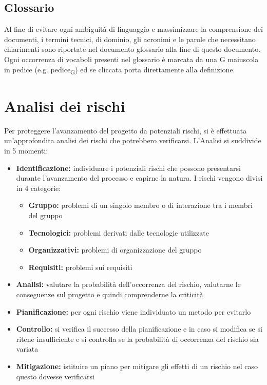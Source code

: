 \documentclass[12pt,a4paper]{article}
\begin{document}
\subsection{Glossario}
Al fine di evitare ogni ambiguità di linguaggio e massimizzare la comprensione dei documenti, i termini tecnici, di dominio, gli acronimi e le parole che necessitano chiarimenti sono riportate nel documento glossario alla fine di questo documento. Ogni occorrenza di vocaboli presenti nel glossario è marcata da una G maiuscola in pedice (e.g. pedice\textsubscript{G}) ed se cliccata porta direttamente alla definizione.

\newpage

\section{Analisi dei rischi}

Per proteggere l’avanzamento del progetto da potenziali rischi, si è effettuata un’approfondita analisi dei rischi che potrebbero verificarsi. L’Analisi si suddivide in 5 momenti:
\begin{itemize}
	\item \textbf{Identificazione:} individuare i potenziali rischi che possono presentarsi durante l’avanzamento del processo e capirne la natura. I rischi vengono divisi in 4 categorie:
	\begin{itemize}
		\item \textbf{Gruppo:} problemi di un singolo membro o di interazione tra i membri del gruppo
		\item \textbf{Tecnologici:} problemi derivati dalle tecnologie utilizzate
		\item \textbf{Organizzativi:} problemi di organizzazione del gruppo
		\item \textbf{Requisiti:} problemi sui requisiti
	\end{itemize}
	\item \textbf{Analisi:} valutare la probabilità dell’occorrenza del rischio, valutarne le conseguenze sul progetto e quindi comprenderne la criticità
	\item \textbf{Pianificazione:} per ogni rischio viene individuato un metodo per evitarlo
	\item \textbf{Controllo:} si verifica il successo della pianificazione e in caso si modifica se si ritene insufficiente e si controlla se la probabilità di occorrenza del rischio sia variata
	\item \textbf{Mitigazione:} istituire un piano per mitigare gli effetti di un rischio nel caso questo dovesse verificarsi
\end{itemize}
\end{document}
